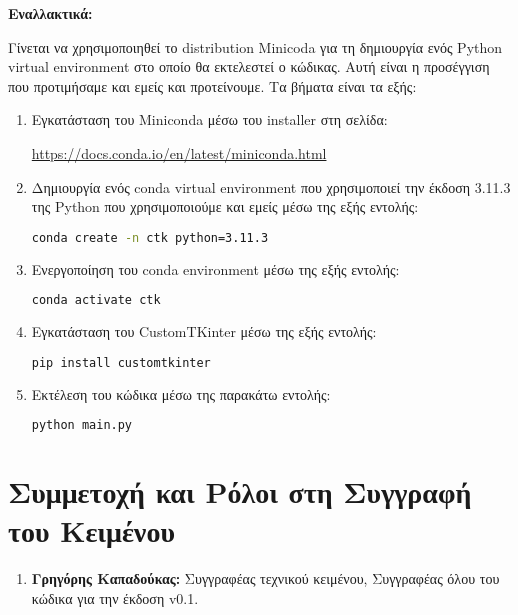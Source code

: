 \documentclass[12pt,a4paper]{article}
\begin{document}
\textbf{Εναλλακτικά:}

Γίνεται να χρησιμοποιηθεί το distribution Minicoda για τη δημιουργία ενός Python virtual environment στο οποίο θα εκτελεστεί ο κώδικας. Αυτή είναι η προσέγγιση που προτιμήσαμε και εμείς και προτείνουμε. Τα βήματα είναι τα εξής:

\begin{enumerate}
    \item Εγκατάσταση του Miniconda μέσω του installer στη σελίδα:

        \textcolor{blue}{\href{https://docs.conda.io/en/latest/miniconda.html}{https://docs.conda.io/en/latest/miniconda.html}}
    \item Δημιουργία ενός conda virtual environment που χρησιμοποιεί την έκδοση 3.11.3 της Python που χρησιμοποιούμε και εμείς μέσω της εξής εντολής:

\begin{lstlisting}[language=Bash]
conda create -n ctk python=3.11.3\end{lstlisting}

    \item Ενεργοποίηση του conda environment μέσω της εξής εντολής:

\begin{lstlisting}[language=Bash]
conda activate ctk\end{lstlisting}

    \item Εγκατάσταση του CustomTKinter μέσω της εξής εντολής:

\begin{lstlisting}[language=Bash]
pip install customtkinter\end{lstlisting}

    \item Εκτέλεση του κώδικα μέσω της παρακάτω εντολής:
\begin{lstlisting}[language=Bash]
python main.py\end{lstlisting}

\end{enumerate}

\section{Συμμετοχή και Ρόλοι στη Συγγραφή του Κειμένου}
\begin{enumerate}
	\item \textbf{Γρηγόρης Καπαδούκας:} Συγγραφέας τεχνικού κειμένου, Συγγραφέας όλου του κώδικα για την έκδοση v0.1.
\end{enumerate}
\end{document}
